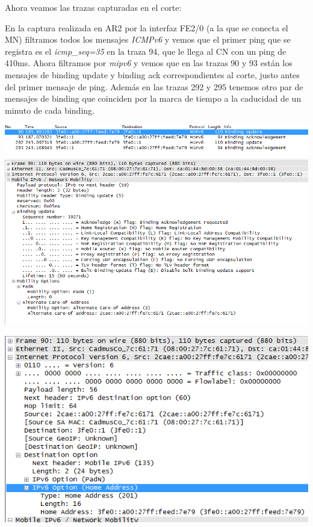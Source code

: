 \documentclass{article}
\begin{document}
Ahora veamos las trazas capturadas en el corte:

En la captura realizada en AR2 por la interfaz FE2/0 (a la que se conecta el MN) filtramos todos los mensajes \textit{ICMPv6} y vemos que el primer ping que se registra es el \textit{icmp\_seq=35} en la traza 94, que le llega al CN con un ping de 410ms. Ahora filtramos por \textit{mipv6} y vemos que en las trazas 90 y 93 están los mensajes de binding update y binding ack correspondientes al corte, justo antes del primer mensaje de ping. Además en las trazas 292 y 295 tenemos otro par de mensajes de binding que coinciden por la marca de tiempo a la caducidad de un minuto de cada binding.



\begin{center} 
	\includegraphics[scale=0.7]{images/bindUpdate.png}
\end{center}

\begin{center} 
	\includegraphics[scale=0.7]{images/bindDestOpt.png}
\end{center}
\end{document}
